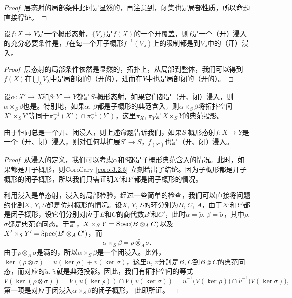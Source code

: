 \begin{proof}
层态射的局部条件此时是显然的，再注意到，闭集也是局部性质，所以命题直接得证。
\end{proof}

\begin{coro}
设$f:X\to Y$是一个概形态射，$\{V_\lambda\}$是$f(X)$的一个开覆盖，则$f$是一个（开）浸入的充分必要条件是，$f$在每一个开子概形$f^{-1}(V_\lambda)$上的限制都是到$V_\lambda$中的（开）浸入。
\end{coro}

\begin{proof}
层态射的局部条件依然是显然的，拓扑上，从局部到整体，我们可以得到$f(X)$在$\bigcup_\lambda V_\lambda$中是局部闭的（开的），进而在$Y$中也是局部闭的（开的）。
\end{proof}

\begin{pro}
设$\alpha:X'\to X$和$\beta:Y'\to Y$都是$S$-概形态射，如果它们都是（开、闭）浸入，则$\alpha\times_S\beta$也是。特别地，如果$\alpha$, $\beta$都是子概形的典范含入，则$\alpha\times_S \beta$将拓扑空间$X'\times_S Y'$等同于$\pi_X^{-1}(X')\cap \pi_Y^{-1}(Y')$，这里$\pi_X$, $\pi_Y$是$X\times_S Y$的典范投影。
\end{pro}

由于恒同总是一个开、闭浸入，则上述命题告诉我们，如果$S$-概形态射$f:X\to Y$是一个（开、闭）浸入，则对任何基扩展$S'\to S$，$f_{(S')}$也是（开、闭）浸入。

\begin{proof}
从浸入的定义，我们可以考虑$\alpha$和$\beta$都是子概形典范含入的情况。此时，如果都是开子概形，则Corollary \ref{coro:3.2.8} 立刻给出了结论。因为子概形都是开子概形的闭子概形，所以我们只需证明$X'$和$Y'$都是闭子概形的情况。

利用浸入是单态射，浸入的局部检验，经过一些简单的检查，我们可以直接将问题约化到$X$, $Y$, $S$都是仿射概形的情况。设$X$, $Y$, $S$的环分别为$B$, $C$, $A$，由于$X'$和$Y'$都是闭子概形，设它们分别对应于$B$和$C$的商代数$B'$和$C'$，此时$\alpha=\widetilde{\rho}$, $\beta=\widetilde{\sigma}$，其中$\rho$, $\sigma$都是典范商同态。于是，$X\times_S Y=\operatorname{Spec}(B\otimes_A C)$以及$X'\times_S Y'=\operatorname{Spec}(B'\otimes_A C')$，而
\[
	\alpha\times_S\beta=\widetilde{\rho\otimes_A\sigma}.
\]
由于$\rho\otimes_A\sigma$是满的，所以$\alpha\times_S\beta$是一个闭浸入。此外，$\ker(\rho\otimes \sigma)=u(\ker \rho)+v(\ker \sigma)$，这里$u$, $v$分别是$B$, $C$到$B\otimes C$的典范同态，而对应的$\widetilde{u}$, $\widetilde{v}$就是典范投影。因此，我们有拓扑空间的等式
\[
	V(\ker(\rho\otimes \sigma))=V(u(\ker\rho))\cap V(v(\ker\sigma))=\widetilde{u}^{-1}\bigl(V(\ker\rho)\bigr)\cap \widetilde{v}^{-1}\bigl(V(\ker \sigma)\bigr),
\]
第一项是对应于闭浸入$\alpha\times_S \beta$的闭子概形，
此即所证。
\end{proof}

